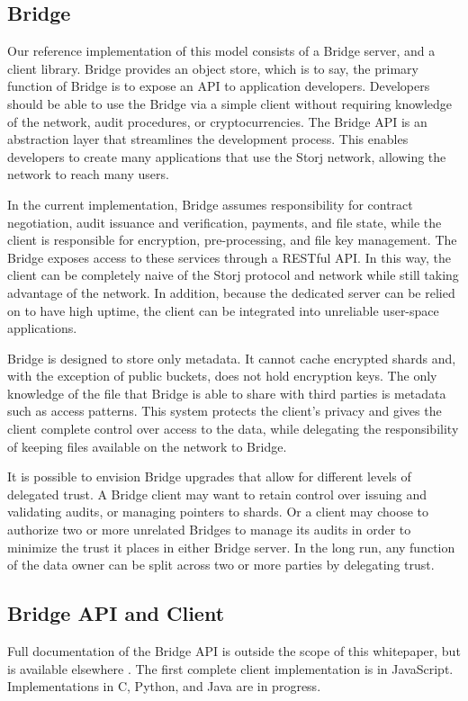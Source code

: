 \documentclass[a4paper,10pt]{article}
\begin{document}
\subsection{Bridge}
Our reference implementation of this model consists of a Bridge server, and a client library. Bridge provides an object store, which is to say, the primary function of Bridge is to expose an API to application developers. Developers should be able to use the Bridge via a simple client without requiring knowledge of the network, audit procedures, or cryptocurrencies. The Bridge API is an abstraction layer that streamlines the development process. This enables developers to create many applications that use the Storj network, allowing the network to reach many users.

In the current implementation, Bridge assumes responsibility for contract negotiation, audit issuance and verification, payments, and file state, while the client is responsible for encryption, pre-processing, and file key management. The Bridge exposes access to these services through a RESTful API. In this way, the client can be completely naive of the Storj protocol and network while still taking advantage of the network. In addition, because the dedicated server can be relied on to have high uptime, the client can be integrated into unreliable user-space applications.

Bridge is designed to store only metadata. It cannot cache encrypted shards and, with the exception of public buckets, does not hold encryption keys. The only knowledge of the file that Bridge is able to share with third parties is metadata such as access patterns. This system protects the client's privacy and gives the client complete control over access to the data, while delegating the responsibility of keeping files available on the network to Bridge.

It is possible to envision Bridge upgrades that allow for different levels of delegated trust. A Bridge client may want to retain control over issuing and validating audits, or managing pointers to shards. Or a client may choose to authorize two or more unrelated Bridges to manage its audits in order to minimize the trust it places in either Bridge server. In the long run, any function of the data owner can be split across two or more parties by delegating trust.

\subsection{Bridge API and Client}
Full documentation of the Bridge API is outside the scope of this whitepaper, but is available elsewhere \cite{16}. The first complete client implementation is in JavaScript. Implementations in C, Python, and Java are in progress.
\end{document}
